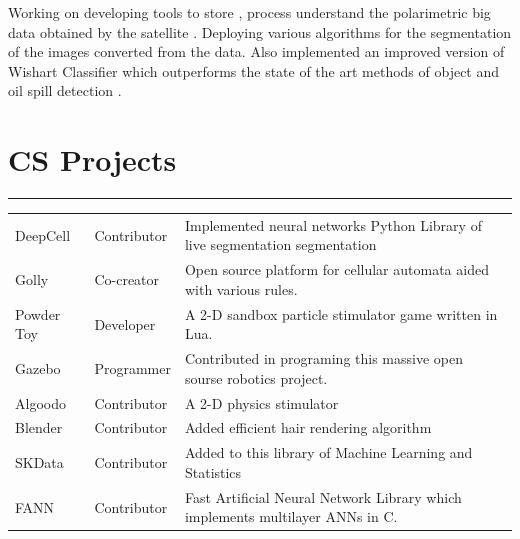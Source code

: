 \documentclass[]{deedy-resume-openfont}
\begin{document}
Working on developing tools to store , process understand the polarimetric big data obtained by the satellite . Deploying various algorithms for the segmentation of the images converted from the data. Also implemented an improved version of Wishart Classifier which outperforms the state of the art methods of object and oil spill detection .
\sectionsep




\section{CS Projects} 
\hrule
\vspace{\topsep}
\begin{tabular}{lll}
DeepCell    & Contributor  &Implemented neural networks  Python Library of live segmentation segmentation \\
Golly	     & Co-creator & Open source platform for cellular automata aided with various rules.\\
Powder Toy	     & Developer  & A 2-D sandbox particle stimulator game written in Lua.\\

Gazebo	     & Programmer& Contributed in programing this massive open sourse robotics project.\\
Algoodo	     & Contributor& A 2-D physics stimulator \\
Blender     & Contributor  & Added efficient hair rendering algorithm  \\
SKData     & Contributor& Added to this library of Machine Learning and Statistics  \\
FANN & Contributor & Fast Artificial Neural Network Library which implements multilayer ANNs in C.\\
\end{tabular}
\sectionsep





\end{document}
